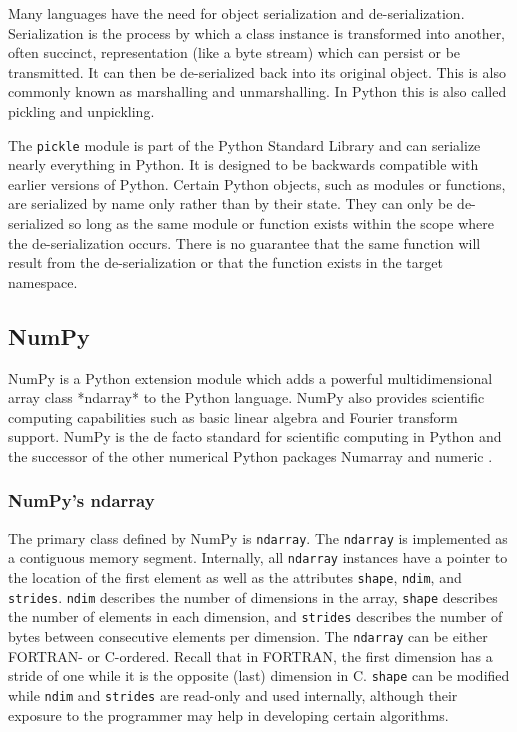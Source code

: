 \documentclass{sigplanconf}
\begin{document}
Many languages have the need for object serialization and de-serialization.
Serialization is the process by which a class instance is transformed into
another, often succinct, representation (like a byte stream) which can
persist or be transmitted. It can then be de-serialized back into its original
object. This is also commonly known as marshalling and unmarshalling. In
Python this is also called pickling and unpickling.

The \texttt{pickle} module is part of the Python Standard Library \cite{Lun01}
and can serialize nearly everything in Python. It is designed to be backwards
compatible with earlier versions of Python. Certain Python objects, such as
modules or functions, are serialized by name only rather than by their state.
They can only be de-serialized so long as the same module or function exists
within the scope where the de-serialization occurs. There is no guarantee that
the same function will result from the de-serialization or that the function
exists in the target namespace.

\subsection{NumPy}

NumPy \cite{Oli06} is a Python extension module which adds a powerful
multidimensional array class *ndarray* to the Python language. NumPy also
provides scientific computing capabilities such as basic linear algebra and
Fourier transform support. NumPy is the de facto standard for scientific
computing in Python and the successor of the other numerical Python packages
Numarray \cite{Dub96} and numeric \cite{Asc99}.

\subsubsection{NumPy's ndarray}

The primary class defined by NumPy is \verb=ndarray=. The \verb=ndarray= is
implemented as a contiguous memory segment. Internally, all \verb=ndarray=
instances have a pointer to the location of the first element as well as the
attributes \verb=shape=, \verb=ndim=, and \verb=strides=. \verb=ndim=
describes the number of dimensions in the array, \verb=shape= describes the
number of elements in each dimension, and \verb=strides= describes the number
of bytes between consecutive elements per dimension. The \verb=ndarray= can be
either FORTRAN- or C-ordered.  Recall that in FORTRAN, the first dimension has
a stride of one while it is the opposite (last) dimension in C. \verb=shape=
can be modified while \verb=ndim= and \verb=strides= are read-only and used
internally, although their exposure to the programmer may help in developing
certain algorithms.
\end{document}
